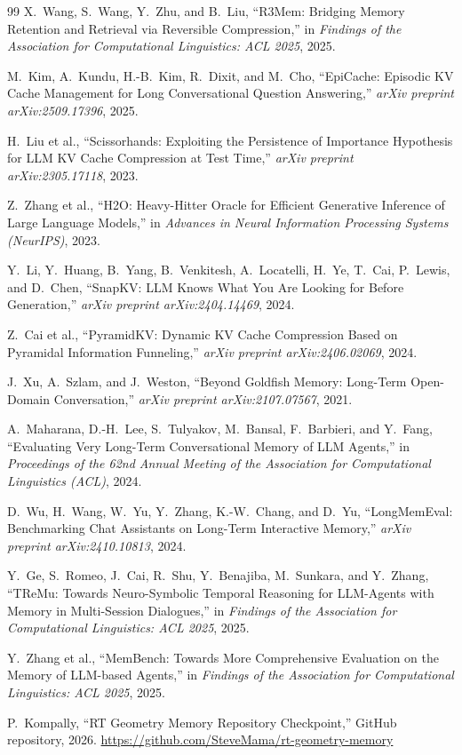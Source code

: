 \documentclass[conference]{IEEEtran}
\begin{document}
\begin{thebibliography}{99}
X.~Wang, S.~Wang, Y.~Zhu, and B.~Liu,
``R3Mem: Bridging Memory Retention and Retrieval via Reversible Compression,''
in \emph{Findings of the Association for Computational Linguistics: ACL 2025}, 2025.

M.~Kim, A.~Kundu, H.-B.~Kim, R.~Dixit, and M.~Cho,
``EpiCache: Episodic KV Cache Management for Long Conversational Question Answering,''
\emph{arXiv preprint arXiv:2509.17396}, 2025.

H.~Liu et al.,
``Scissorhands: Exploiting the Persistence of Importance Hypothesis for LLM KV Cache Compression at Test Time,''
\emph{arXiv preprint arXiv:2305.17118}, 2023.

Z.~Zhang et al.,
``H2O: Heavy-Hitter Oracle for Efficient Generative Inference of Large Language Models,''
in \emph{Advances in Neural Information Processing Systems (NeurIPS)}, 2023.

Y.~Li, Y.~Huang, B.~Yang, B.~Venkitesh, A.~Locatelli, H.~Ye, T.~Cai, P.~Lewis, and D.~Chen,
``SnapKV: LLM Knows What You Are Looking for Before Generation,''
\emph{arXiv preprint arXiv:2404.14469}, 2024.

Z.~Cai et al.,
``PyramidKV: Dynamic KV Cache Compression Based on Pyramidal Information Funneling,''
\emph{arXiv preprint arXiv:2406.02069}, 2024.

J.~Xu, A.~Szlam, and J.~Weston,
``Beyond Goldfish Memory: Long-Term Open-Domain Conversation,''
\emph{arXiv preprint arXiv:2107.07567}, 2021.

A.~Maharana, D.-H.~Lee, S.~Tulyakov, M.~Bansal, F.~Barbieri, and Y.~Fang,
``Evaluating Very Long-Term Conversational Memory of LLM Agents,''
in \emph{Proceedings of the 62nd Annual Meeting of the Association for Computational Linguistics (ACL)}, 2024.

D.~Wu, H.~Wang, W.~Yu, Y.~Zhang, K.-W.~Chang, and D.~Yu,
``LongMemEval: Benchmarking Chat Assistants on Long-Term Interactive Memory,''
\emph{arXiv preprint arXiv:2410.10813}, 2024.

Y.~Ge, S.~Romeo, J.~Cai, R.~Shu, Y.~Benajiba, M.~Sunkara, and Y.~Zhang,
``TReMu: Towards Neuro-Symbolic Temporal Reasoning for LLM-Agents with Memory in Multi-Session Dialogues,''
in \emph{Findings of the Association for Computational Linguistics: ACL 2025}, 2025.

Y.~Zhang et al.,
``MemBench: Towards More Comprehensive Evaluation on the Memory of LLM-based Agents,''
in \emph{Findings of the Association for Computational Linguistics: ACL 2025}, 2025.

P.~Kompally,
``RT Geometry Memory Repository Checkpoint,''
GitHub repository, 2026.
\url{https://github.com/SteveMama/rt-geometry-memory}

\end{thebibliography}
\end{document}
